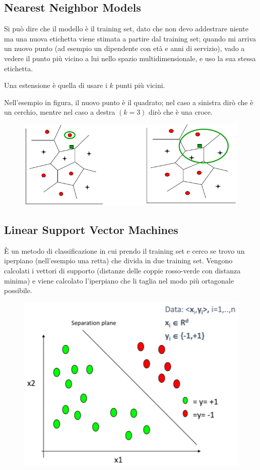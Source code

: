 \documentclass{report}
\begin{document}
\subsection{Nearest Neighbor Models}

Si può dire che il modello è il training set, dato che non devo addestrare niente ma una nuova etichetta viene stimata a partire dal training 
set; quando mi arriva un nuovo punto (ad esempio un dipendente con età e anni di servizio), vado a vedere il punto più vicino a lui nello spazio 
multidimensionale, e uso la sua stessa etichetta.

\noindent Una estensione è quella di usare i $k$ punti più vicini.

\noindent Nell'esempio in figura, il nuovo punto è il quadrato; nel caso a sinistra dirò che è un cerchio, mentre nel caso a destra $(k=3)$ dirò che 
è una croce.

\begin{figure}[H]
    \centering
    \includegraphics[width=0.8\linewidth]{images/nn.png}
\end{figure}

\subsection{Linear Support Vector Machines}
È un metodo di classificazione in cui prendo il training set e cerco se trovo un iperpiano (nell'esempio una retta) che 
divida in due training set. Vengono calcolati i vettori di supporto (distanze delle coppie rosso-verde con distanza minima) e viene calcolato 
l'iperpiano che li taglia nel modo più ortagonale possibile.

\begin{figure}[H]
    \centering
    \includegraphics[width=0.6\linewidth]{images/svm.png}
\end{figure}
\end{document}

